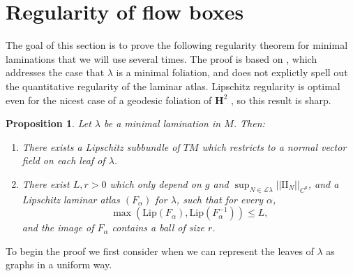 \documentclass[reqno,11pt]{amsart}
\newcommand{\Hyp}{\mathbf H}
\newcommand{\Leaves}{\mathscr L}
\newcommand{\Two}{\mathrm{I\!I}}
\newcommand{\Lip}{\mathrm{Lip}}
\newtheorem{proposition}[theorem]{Proposition}
\theoremstyle{definition}
\numberwithin{equation}{section}
\begin{document}
\section{Regularity of flow boxes}\label{Regularity}
The goal of this section is to prove the following regularity theorem for minimal laminations that we will use several times.
The proof is based on \cite[Theorem 1.1]{Solomon86}, which addresses the case that $\lambda$ is a minimal foliation, and does not explictly spell out the quantitative regularity of the laminar atlas.
Lipschitz regularity is optimal even for the nicest case of a geodesic foliation of $\Hyp^2$ \cite[\S1]{Solomon86}, so this result is sharp.

\begin{proposition}\label{regularity theorem}
Let $\lambda$ be a minimal lamination in $M$. Then:
\begin{enumerate}
\item There exists a Lipschitz subbundle of $TM$ which restricts to a normal vector field on each leaf of $\lambda$.
\item There exist $L, r > 0$ which only depend on $g$ and $\sup_{N \in \Leaves \lambda} ||\Two_N||_{C^0}$, and a Lipschitz laminar atlas $(F_\alpha)$ for $\lambda$, such that for every $\alpha$,
\begin{equation}\label{conorm of flow box}
	\max(\Lip(F_\alpha), \Lip(F_\alpha^{-1})) \leq L,
\end{equation}
and the image of $F_\alpha$ contains a ball of size $r$.
\end{enumerate}
\end{proposition}

To begin the proof we first consider when we can represent the leaves of $\lambda$ as graphs in a uniform way.
\end{document}
